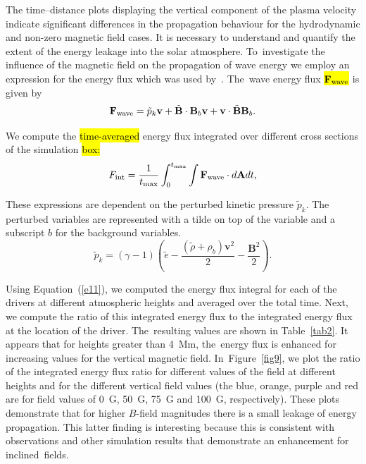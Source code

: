 \documentclass[physics,article,accept,pdftex,moreauthors]{Definitions/mdpi}
\begin{document}
The time--distance plots displaying the vertical component of the plasma velocity indicate significant differences in the propagation 
behaviour for the hydrodynamic and non-zero magnetic field cases. It is necessary to understand and quantify the extent of the energy 
leakage into the solar atmosphere. To~investigate the influence of the magnetic field on the propagation of wave energy we employ an 
expression for the energy flux which was used by~\cite{Bogdan2003}. The~wave energy flux 
 \hl{${\bf F}_{\rm wave}$} %
 is given by
$$
{\mathbf F}_{\rm wave}=\tilde{p}_{k} {\mathbf v}+\tilde{\mathbf B}\cdot {\mathbf B_{b}}{\mathbf v}+{\mathbf v}\cdot \tilde{\mathbf 
B}{\mathbf B_{b}} .
$$

We compute the \hl{time-averaged} %
energy flux integrated over different cross sections of the simulation \hl{box:} %
\begin{equation}
F_{\rm int}= \frac{1}{t_{\rm max}} \int_{0}^{t_{\rm max}} \int {\mathbf F}_{\rm wave} \cdot d{\mathbf A}dt,
\label{e11}
\end{equation}

These expressions are dependent on the perturbed kinetic pressure $\tilde{p}_{k}$. The perturbed variables are represented with a tilde  on top of the variable and a subscript $b$ for the background variables. 
$$
\tilde{p}_{k}=\left(\gamma - 1\right)\left( \tilde{e}-\frac{ \left( \tilde{\rho} +\rho_b \right){\mathbf v}^2}{2}-\frac{{\mathbf B}^2}{2}\right).
$$


Using Equation~(\ref{e11}), we computed the energy flux integral for each of the drivers at different atmospheric heights and averaged over the total time. Next, we compute the ratio of this integrated energy flux to the integrated energy flux at the location of the driver. The~resulting values are shown in Table~\ref{tab2}. It appears that for heights greater than 4~Mm, the~energy flux is enhanced for increasing values for the vertical magnetic field. In~Figure~\ref{fig9},
we plot the ratio of the integrated energy flux ratio for different values of the field at different heights and for the different vertical field values (the blue, orange, purple and red  are for field values of 0~G, 50~G, 75~G and 100~G, respectively). These plots demonstrate that for higher $B$-field magnitudes there is a small leakage of energy propagation. This latter finding is interesting because this is consistent with observations and other simulation results that demonstrate an enhancement for inclined~fields.
\end{document}
